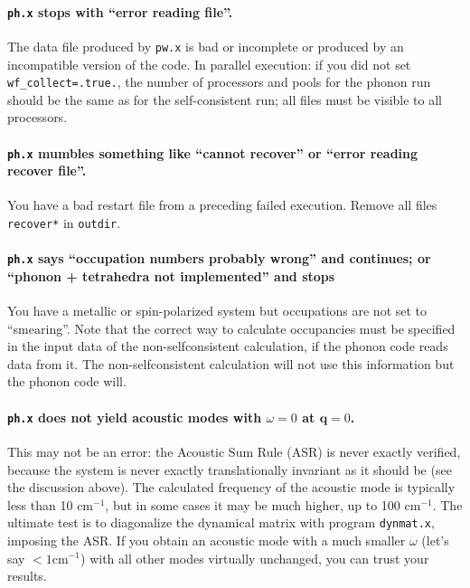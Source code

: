 \documentclass[12pt,a4paper]{article}
\begin{document}
\paragraph{\texttt{ph.x} stops with ``error reading file''.}

The data file produced by \texttt{pw.x} is bad or incomplete or
produced by an incompatible version of the code.
In parallel execution: if you did not set \texttt{wf\_collect=.true.},
the number of processors and pools for the phonon run should be the 
same as for the self-consistent run; all files must be visible to all 
processors.

\paragraph{\texttt{ph.x} mumbles something like ``cannot recover'' or
           ``error reading recover file''.}

You have a bad restart file from a preceding failed execution.
Remove all files \texttt{recover*} in \texttt{outdir}.

\paragraph{\texttt{ph.x} says ``occupation numbers probably wrong''
and continues; or ``phonon + tetrahedra not implemented'' and stops}

You have a metallic or spin-polarized system but occupations are not 
set to ``smearing''. Note that the correct way to calculate occupancies 
must be specified in the input data of the non-selfconsistent 
calculation, if the phonon code reads data from it. The non-selfconsistent 
calculation will not use this information but the phonon code will.

\paragraph{\texttt{ph.x} does not yield acoustic modes with $\omega=0$
           at $\mathbf{q}=0$.}

This may not be an error: the Acoustic Sum Rule (ASR) is never exactly
verified, because the system is never exactly translationally
invariant as it should be (see the discussion above).
The calculated frequency of the acoustic mode is typically less than
10 cm$^{-1}$, but in some cases it may be much higher, up to 100
cm$^{-1}$.
The ultimate test is to diagonalize the dynamical matrix with program
\texttt{dynmat.x}, imposing the ASR.
If you obtain an acoustic mode with a much smaller $\omega$ (let's say
$<1 \textrm{cm}^{-1}$) with all other modes virtually unchanged, you
can trust your results.
\end{document}

